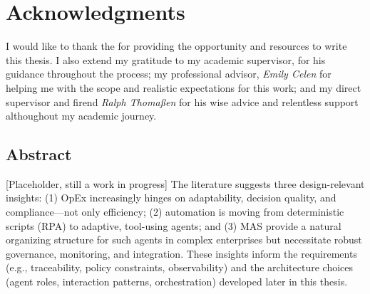 \thispagestyle{empty}
\section*{Acknowledgments}
I would like to thank the \textit{\myCompany} for providing the opportunity and resources to write this thesis. 
I also extend my gratitude to my academic supervisor, \textit{\mySupervisor{}} for his guidance throughout the process; my professional advisor, \textit{Emily Celen} for helping me with the scope and realistic expectations for this work; and my direct supervisor and firend \textit{Ralph Thomaßen} for his wise advice and relentless support althoughout my academic journey.
\newpage

\begin{centering}
\section*{Abstract}
\end{centering}
[Placeholder, still a work in progress] The literature suggests three design-relevant insights: (1) OpEx increasingly hinges on adaptability, decision quality, and compliance—not only efficiency; (2) automation is moving from deterministic scripts (RPA) to adaptive, tool-using agents; and (3) MAS provide a natural organizing structure for such agents in complex enterprises but necessitate robust governance, monitoring, and integration. These insights inform the requirements (e.g., traceability, policy constraints, observability) and the architecture choices (agent roles, interaction patterns, orchestration) developed later in this thesis.
\newpage


\tableofcontents \clearpage
\renewcommand{\nomname}{Abbreviations}
\setlength{\nomlabelwidth}{.25\hsize}
\renewcommand{\nomlabel}[1]{#1 \dotfill}
\setlength{\nomitemsep}{-\parsep}
{\small \printnomenclature}
\clearpage
{}